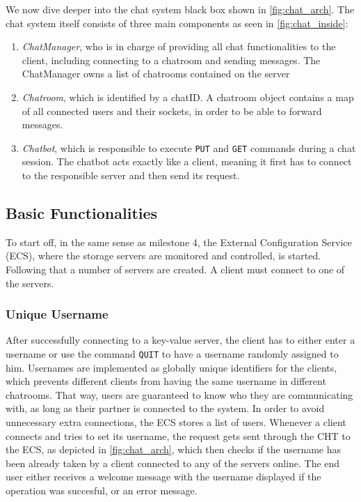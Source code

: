 We now dive deeper into the chat system black box shown in \ref{fig:chat_arch}. The chat system itself consists of three main components as seen in \ref{fig:chat_inside}:

\begin{enumerate}
	\item \textit{ChatManager}, who is in charge of providing all chat functionalities to the client, including connecting to a chatroom and sending messages. The ChatManager owns a list of chatrooms contained on the server
	\item \textit{Chatroom}, which is identified by a chatID. A chatroom object contains a map of all connected users and their sockets, in order to be able to forward messages.
	\item \textit{Chatbot}, which is responsible to execute \texttt{PUT} and \texttt{GET} commands during a chat session. The chatbot acts exactly like a client, meaning it first has to connect to the responsible server and then send its request.
\end{enumerate}

\subsection{Basic Functionalities}
\label{sec:groupchat_functionalities}
To start off, in the same sense as milestone 4, the External Configuration Service (ECS), where the storage servers are monitored and controlled, is started. Following that a number of servers are created. A client must connect to one of the servers.

\subsubsection{Unique Username}
\label{sec:groupchat_funtionalities_uniqueusername}
After successfully connecting to a key-value server, the client has to either enter a username or use the command \texttt{QUIT} to have a username randomly assigned to him. Usernames are implemented as globally unique identifiers for the clients, which prevents different clients from having the same username in different chatrooms. That way, users are guaranteed to know who they are communicating with, as long as their partner is connected to the system.
In order to avoid unnecessary extra connections, the ECS stores a list of users. Whenever a client connects and tries to set its username, the request gets sent through the CHT to the ECS, as depicted in \ref{fig:chat_arch}, which then checks if the username has been already taken by a client connected to any of the servers online. The end user either receives a welcome message with the username displayed if the operation was succesful, or an error message.
 
